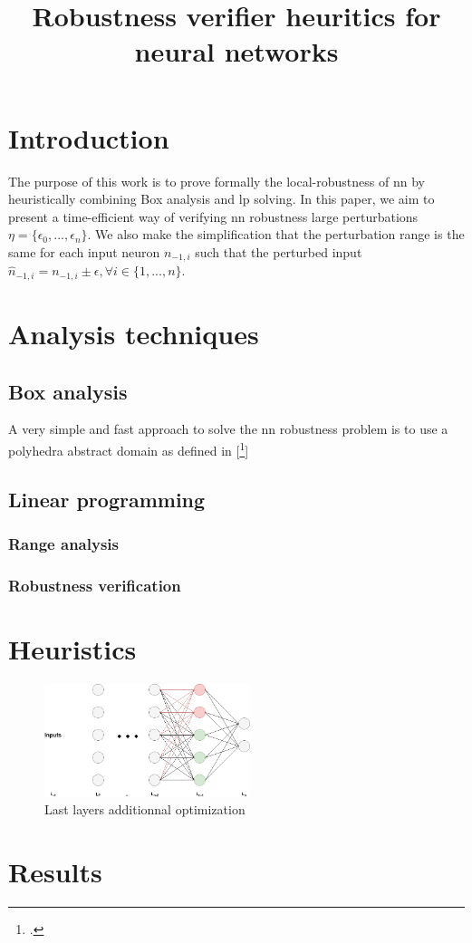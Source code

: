 \documentclass[10pt,a4paper]{article}
\title{
	Robustness verifier heuritics for neural networks
}
\begin{document}
\maketitle

\section*{Introduction}

The purpose of this work is to prove formally the local-robustness of \gls{nn} by heuristically combining Box analysis and \gls{lp} solving. 
In this paper, we aim to present a time-efficient way of verifying \gls{nn} robustness large perturbations $\eta = \{\epsilon_0, ..., \epsilon_{n}\}$. We also make the simplification that the perturbation range is the same for each input neuron $n_{-1,i}$ such that the perturbed input $\hat{n}_{-1,i} = n_{-1,i} \pm \epsilon, \forall i \in \{1, ..., n\}$.

\section{Analysis techniques}
\subsection{Box analysis}

A very simple and fast approach to solve the \gls{nn} robustness problem is to use a polyhedra abstract domain as defined in [\footcite{AI2}]

\subsection{Linear programming}

\subsubsection{Range analysis}

\subsubsection{Robustness verification}

\section{Heuristics}

\begin{figure}[H]
\begin{center}
\includegraphics[width=6cm]{NN_lastlayer.png}
\caption{Last layers additionnal optimization}
\end{center}
\end{figure}

\section{Results}
\end{document}
